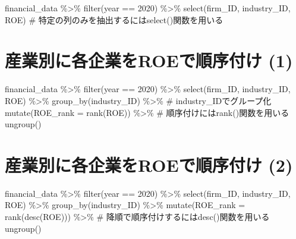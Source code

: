 \documentclass[
  letterpaper,
  DIV=11,
  numbers=noendperiod]{scrreprt}
\newenvironment{Shaded}{\begin{snugshade}}{\end{snugshade}}
\newcommand{\AttributeTok}[1]{\textcolor[rgb]{0.40,0.45,0.13}{#1}}
\newcommand{\CommentTok}[1]{\textcolor[rgb]{0.37,0.37,0.37}{#1}}
\newcommand{\DecValTok}[1]{\textcolor[rgb]{0.68,0.00,0.00}{#1}}
\newcommand{\FunctionTok}[1]{\textcolor[rgb]{0.28,0.35,0.67}{#1}}
\newcommand{\NormalTok}[1]{\textcolor[rgb]{0.00,0.23,0.31}{#1}}
\newcommand{\SpecialCharTok}[1]{\textcolor[rgb]{0.37,0.37,0.37}{#1}}
\begin{document}
\begin{Shaded}
\begin{Highlighting}[]
\NormalTok{financial\_data }\SpecialCharTok{\%\textgreater{}\%} 
  \FunctionTok{filter}\NormalTok{(year }\SpecialCharTok{==} \DecValTok{2020}\NormalTok{) }\SpecialCharTok{\%\textgreater{}\%}
  \FunctionTok{select}\NormalTok{(firm\_ID, industry\_ID, ROE) }\CommentTok{\# 特定の列のみを抽出するにはselect()関数を用いる}
\end{Highlighting}
\end{Shaded}

\section{産業別に各企業をROEで順序付け
(1)}\label{ux7523ux696dux5225ux306bux5404ux4f01ux696dux3092roeux3067ux9806ux5e8fux4ed8ux3051-1}

\begin{Shaded}
\begin{Highlighting}[]
\NormalTok{financial\_data }\SpecialCharTok{\%\textgreater{}\%}
  \FunctionTok{filter}\NormalTok{(year }\SpecialCharTok{==} \DecValTok{2020}\NormalTok{) }\SpecialCharTok{\%\textgreater{}\%}
  \FunctionTok{select}\NormalTok{(firm\_ID, industry\_ID, ROE) }\SpecialCharTok{\%\textgreater{}\%}
  \FunctionTok{group\_by}\NormalTok{(industry\_ID) }\SpecialCharTok{\%\textgreater{}\%} \CommentTok{\# industry\_IDでグループ化}
  \FunctionTok{mutate}\NormalTok{(}\AttributeTok{ROE\_rank =} \FunctionTok{rank}\NormalTok{(ROE)) }\SpecialCharTok{\%\textgreater{}\%} \CommentTok{\# 順序付けにはrank()関数を用いる}
  \FunctionTok{ungroup}\NormalTok{()}
\end{Highlighting}
\end{Shaded}

\section{産業別に各企業をROEで順序付け
(2)}\label{ux7523ux696dux5225ux306bux5404ux4f01ux696dux3092roeux3067ux9806ux5e8fux4ed8ux3051-2}

\begin{Shaded}
\begin{Highlighting}[]
\NormalTok{financial\_data }\SpecialCharTok{\%\textgreater{}\%}
  \FunctionTok{filter}\NormalTok{(year }\SpecialCharTok{==} \DecValTok{2020}\NormalTok{) }\SpecialCharTok{\%\textgreater{}\%}
  \FunctionTok{select}\NormalTok{(firm\_ID, industry\_ID, ROE) }\SpecialCharTok{\%\textgreater{}\%}
  \FunctionTok{group\_by}\NormalTok{(industry\_ID) }\SpecialCharTok{\%\textgreater{}\%}
  \FunctionTok{mutate}\NormalTok{(}\AttributeTok{ROE\_rank =} \FunctionTok{rank}\NormalTok{(}\FunctionTok{desc}\NormalTok{(ROE))) }\SpecialCharTok{\%\textgreater{}\%} \CommentTok{\# 降順で順序付けするにはdesc()関数を用いる}
  \FunctionTok{ungroup}\NormalTok{()}
\end{Highlighting}
\end{Shaded}
\end{document}
